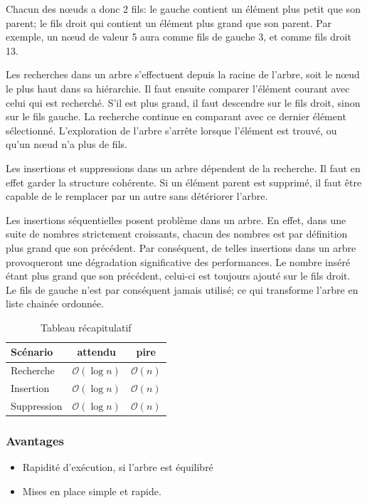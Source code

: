 \documentclass[hidelinks,a4paper, 12pt]{article}
\begin{document}
	
	
	Chacun des nœuds a donc 2 fils: le gauche contient un élément plus petit que son parent; le fils droit qui contient un élément plus grand que son parent. Par exemple, un nœud de valeur 5 aura comme fils de gauche 3, et comme fils droit 13.
	
	Les recherches dans un arbre s'effectuent depuis la racine de l'arbre, soit le nœud le plus haut dans sa hiérarchie. Il faut ensuite comparer l'élément courant avec celui qui est recherché. S'il est plus grand, il faut descendre sur le fils droit, sinon sur le fils gauche. La recherche continue en comparant avec ce dernier élément sélectionné. L'exploration de l'arbre s'arrête lorsque l'élément est trouvé, ou qu'un nœud n'a plus de fils.
	
	Les insertions et suppressions dans un arbre dépendent de la recherche. Il faut en effet garder la structure cohérente. Si un élément parent est supprimé, il faut être capable de le remplacer par un autre sans détériorer l'arbre.
	
	Les insertions séquentielles posent problème dans un arbre. En effet, dans une suite de nombres strictement croissants, chacun des nombres est par définition plus grand que son précédent. Par conséquent, de telles insertions dans un arbre provoqueront une dégradation significative des performances. Le nombre inséré étant plus grand que son précédent, celui-ci est toujours ajouté sur le fils droit. Le fils de gauche n'est par conséquent jamais utilisé; ce qui transforme l'arbre en liste chainée ordonnée.
	
	 \begin{table}[h]
	 	\begin{tabular}{|l|c|c|}
	 		\hline
	 		Scénario & attendu & pire \\
	 		\hline
	 		Recherche & $\mathcal{O}(\log n)$ & $\mathcal{O}(n)$ \\ 
	 		\hline
	 		Insertion & $\mathcal{O}(\log n)$ & $\mathcal{O}(n)$ \\
	 		\hline
	 		Suppression & $\mathcal{O}(\log n)$ & $\mathcal{O}(n)$\\
	 		\hline
	 	\end{tabular}
	 	\caption{Tableau récapitulatif}
	 \end{table}
	
	\subsubsection*{Avantages}
	\begin{itemize}
		\item Rapidité d'exécution, si l'arbre est équilibré
		\item Mises en place simple et rapide.
	\end{itemize}
\end{document}

